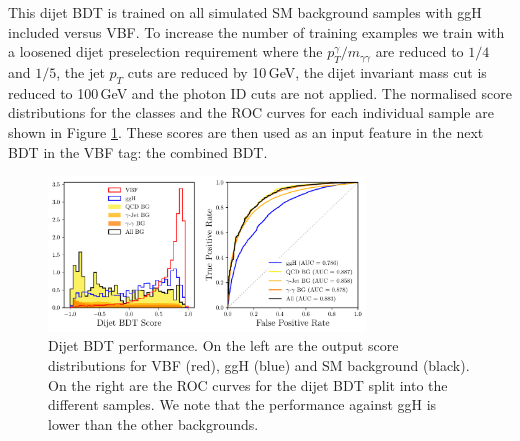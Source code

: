 This dijet BDT is trained on all simulated SM background samples with ggH included versus VBF. To increase the number of training examples we train with a loosened dijet preselection requirement where the $p_{T}^{\gamma}/m_{\gamma\gamma}$ are reduced to $1/4$ and $1/5$, the jet $p_T$ cuts are reduced by 10\,GeV, the dijet invariant mass cut is reduced to 100\,GeV and the photon ID cuts are not applied.
The normalised score distributions for the classes and the ROC curves for each individual sample are shown in Figure \ref{fig:event_categorisaton:dijet_bdt_performance}.
These scores are then used as an input feature in the next BDT in the VBF tag: the combined BDT. 
\begin{figure}[h!]
        \includegraphics[width=0.75\textwidth]{figures/event_selection/dijet_BDT_PS.pdf}
    \caption{Dijet BDT performance. On the left are the output score distributions for VBF (red), ggH (blue) and SM background (black). On the right are the ROC curves for the dijet BDT split into the different samples. We note that the performance against ggH is lower than the other backgrounds.}
    \label{fig:event_categorisaton:dijet_bdt_performance}
\end{figure}









